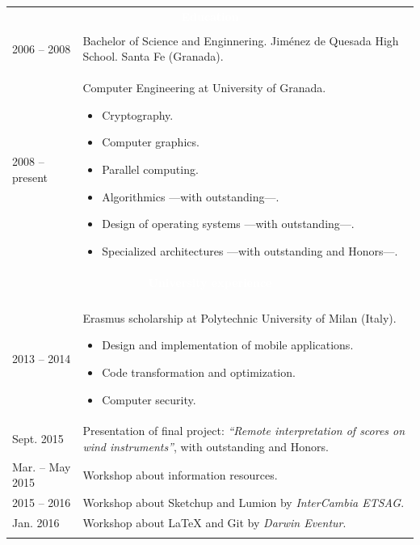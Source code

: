 \documentclass[12pt,a4paper]{article}
\newcommand{\header}[1]{\multicolumn{2}{c}{\cellcolor{black} \textcolor{white} {#1}} \\}
\begin{document}
	\begin{longtable}{p{}p{}}
		\\
		\header{\textbf{Education}}
		\\
		2006 -- 2008 & Bachelor of Science and Enginnering. \newline
		Jiménez de Quesada High School. Santa Fe (Granada). \\
		2008 -- present & Computer Engineering at University of Granada.
		\begin{itemize} \itemsep 0pt \parskip 0pt
			\item Cryptography.
			\item Computer graphics.
			\item Parallel computing.
			\item Algorithmics ---with outstanding---.
			\item Design of operating systems ---with outstanding---.
			\item Specialized architectures ---with outstanding and Honors---.
		\end{itemize}
		\\
		\header{\textbf{University experience}}
		\\
		2013 -- 2014 & Erasmus scholarship at Polytechnic University of Milan
		(Italy).
		\begin{itemize} \itemsep 0pt \parskip 0pt
			\item Design and implementation of mobile applications.
			\item Code transformation and optimization.
			\item Computer security.
		\end{itemize} \\
		Sept. 2015 & Presentation of final project: \textit{``Remote 
		interpretation of scores on wind instruments''}, with outstanding and 
		Honors. \\
		Mar. -- May 2015 & Workshop about information resources. \\
		2015 -- 2016 & Workshop about Sketchup and Lumion by \textit{InterCambia 
		ETSAG}. \\
		Jan. 2016 & Workshop about LaTeX and Git by \textit{Darwin Eventur}. \\
		\end{tabular}
		


\end{longtable}
\end{document}
